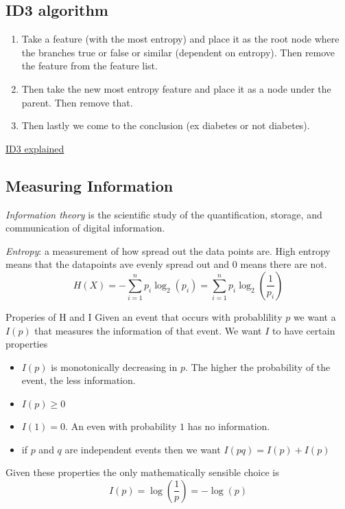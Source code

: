 \begin{multicols}{2}
\subsection{ID3 algorithm}
\begin{enumerate}
    \item Take a feature (with the most entropy) and place it as the root node where the branches true or false or similar (dependent on entropy). Then remove the feature from the feature list.
    \item Then take the new most entropy feature and place it as a node under the parent. Then remove that. 
    \item Then lastly we come to the conclusion (ex diabetes or not diabetes).
\end{enumerate}
\href{https://www.youtube.com/watch?v=aLsReomQ7AA}{ID3 explained}

\subsection{Measuring Information}
\textit{Information theory} is the scientific study of the quantification, 
storage, and communication of digital information.

\textit{Entropy}: a measurement of how spread out the data points are. High entropy means 
that the datapoints ave evenly spread out and 0 means there are not.
\begin{equation*}
    H(X) = -\sum_{i=1}^{n} p_i\log_2(p_i) = \sum_{i=1}^{n} p_i\log_2\left(\frac{1}{p_i}\right)
\end{equation*}

Properies of H and I
Given an event that occurs with probablility $p$ we want a $I(p)$ that measures the 
information of that event. We want $I$ to have certain properties
\begin{itemize}
    \item $I(p)$ is monotonically decreasing in $p$. The higher the probability of the 
    event, the less information.
    \item $I(p) \geq 0$
    \item $I(1) = 0$. An even with probability $1$ has no information.
    \item if $p$ and $q$ are independent events then we want $I(pq) = I(p) + I(p)$
\end{itemize}
Given these properties the only mathematically sensible choice is 
\begin{equation*}
    I(p) = \log\left(\frac{1}{p}\right) = -\log(p)
\end{equation*}


\end{multicols}
